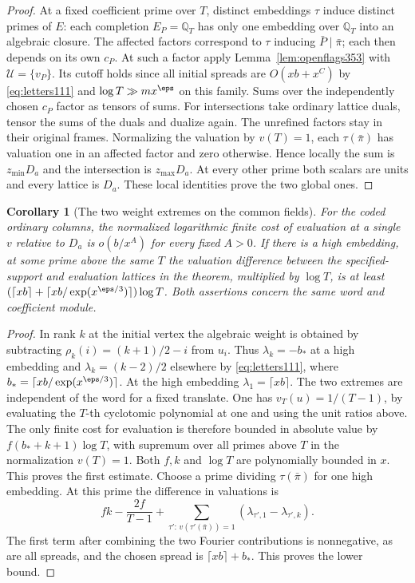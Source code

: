 \documentclass[a4paper,11pt]{article}
\newtheorem{corollary}[proposition]{Corollary}
\theoremstyle{definition}
\theoremstyle{remark}
\numberwithin{equation}{section}
\begin{document}
\begin{proof}
At a fixed coefficient prime over \(T\), distinct embeddings
\(\tau\) induce distinct primes of \(E\): each completion
\(E_P=\mathbb Q_T\) has only one embedding over \(\mathbb Q_T\)
into an algebraic closure. The affected factors correspond to
\(\tau\) inducing \(\bar P\mid\bar\pi\); each then depends
on its own \(c_P\). At such a factor apply
Lemma~\ref{lem:openflags353} with \(\mathcal U=\{v_P\}\).
Its cutoff holds since all initial spreads are \(O(xb+x^C)\) by
\eqref{eq:letters111} and \(\log T\gg m x^\eps\) on this family.
Sums over the independently chosen \(c_P\) factor as tensors
of sums. For intersections take ordinary lattice duals, tensor
the sums of the duals and dualize again. The unrefined factors
stay in their original frames. Normalizing the valuation by
\(v(T)=1\), each \(\tau(\bar\pi)\) has valuation one in an
affected factor and zero otherwise. Hence locally the sum is
\(z_{\min}D_a\) and the intersection is \(z_{\max}D_a\).
At every other prime both scalars are units and every lattice
is \(D_a\). These local identities prove the two global ones.
\end{proof}

\begin{corollary}[The two weight extremes on the common fields]\leavevmode
\label{cor:isolatedcost353}
For the coded ordinary columns, the normalized logarithmic finite
cost of evaluation at a single \(v\) relative to \(D_a\) is
\(o(b/x^A)\) for every fixed \(A>0\). If there is a high
embedding, at some prime above the same \(T\) the valuation
difference between the specified-support and evaluation lattices
in the theorem, multiplied by \(\log T\), is at least
\((\lceil xb\rceil+\lceil xb/\exp(x^{\eps/3})\rceil)\log T\).
Both assertions concern the same word and coefficient module.
\end{corollary}
\begin{proof}
In rank \(k\) at the initial vertex the algebraic weight is obtained
by subtracting \(\rho_k(i)=(k+1)/2-i\) from \(u_i\). Thus
\(\lambda_k=-b_*\) at a high embedding and
\(\lambda_k=(k-2)/2\) elsewhere by \eqref{eq:letters111}, where
\(b_*=\lceil xb/\exp(x^{\eps/3})\rceil\). At the high embedding
\(\lambda_1=\lceil xb\rceil\). The two extremes are independent
of the word for a fixed translate. One has \(v_T(u)=1/(T-1)\),
by evaluating the \(T\)-th cyclotomic polynomial at one and
using the unit ratios above. The only finite cost for evaluation
is therefore bounded in absolute value by
\(f(b_*+k+1)\log T\), with supremum over all primes above \(T\)
in the normalization \(v(T)=1\). Both \(f,k\) and \(\log T\)
are polynomially bounded in \(x\). This proves the first estimate.
Choose a prime dividing \(\tau(\bar\pi)\) for one high embedding.
At this prime the difference in valuations is
\[
    fk-\frac{2f}{T-1}
        +\sum_{\tau':\,v(\tau'(\bar\pi))=1}
                      (\lambda_{\tau',1}-\lambda_{\tau',k}) .
\]
The first term after combining the two Fourier contributions is
nonnegative, as are all spreads, and the chosen spread is
\(\lceil xb\rceil+b_*\). This proves the lower bound.
\end{proof}
\end{document}
